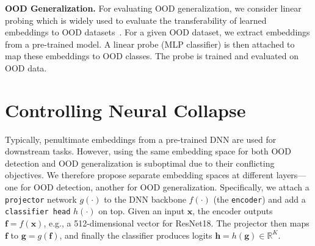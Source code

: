 \textbf{OOD Generalization.}
For evaluating OOD generalization, we consider linear probing which is widely used to evaluate the transferability of learned embeddings to OOD datasets~\cite{alain2016understanding,masarczyk2023tunnel,zhu2022ood_probe,waldis2024dive_probe,grill2020bootstrap,he2020momentum}. 
For a given OOD dataset, we extract embeddings from a pre-trained model. A linear probe (MLP classifier) is then attached to map these embeddings to OOD classes. The probe is trained and evaluated on OOD data.









\section{Controlling Neural Collapse}
\label{sec:framework}

Typically, penultimate embeddings from a pre-trained DNN are used for downstream tasks. However, using the same embedding space for both OOD detection and OOD generalization is suboptimal due to their conflicting objectives. We therefore propose separate embedding spaces at different layers—one for OOD detection, another for OOD generalization. Specifically, we attach a \texttt{projector} network $g(\cdot)$ to the DNN backbone $f(\cdot)$ (the \texttt{encoder}) and add a \texttt{classifier head} $h(\cdot)$ on top. Given an input $\mathbf{x}$, the encoder outputs $\mathrm{\mathbf{f}} = f(\mathbf{x})$, e.g., a 512-dimensional vector for ResNet18. The projector then maps $\mathrm{\mathbf{f}}$ to $\mathrm{\mathbf{g}} = g(\mathrm{\mathbf{f}})$, and finally the classifier produces logits $\mathrm{\mathbf{h}} = h(\mathrm{\mathbf{g}}) \in \mathbb{R}^K$.

